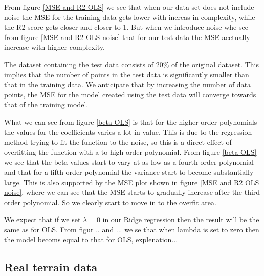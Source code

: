 \noindent From figure \eqref{MSE and R2 OLS} we see that when our data set does not include noise
the MSE for the training data gets lower with increas in complexity, while 
the R2 score gets closer and closer to 1. But when we introduce noise whe see from figure \eqref{MSE and R2 OLS noise}
that for our test data the MSE acctually increase with higher complexity. 

The dataset containing the test data consists of $20\%$ of the original
dataset. This implies that the number of points in the test data is 
significantly smaller than that in the training data. We anticipate 
that by increasing the number of data points, the MSE for the model 
created using the test data will converge towards that of the training
model.

What we can see from figure \eqref{beta OLS} is that for the higher order 
polynomials the values for the coefficients varies a lot in value. This is due to 
the regression method trying to fit the function to the noise, so this is a direct 
effect of overfitting the function with a to high order polynomial. From figure \eqref{beta OLS}
we see that the beta values start to vary at as low as a fourth order polynomial and that 
for a fifth order polynomial the variance start to become substantially large. This is 
also supported by the MSE plot shown in figure \eqref{MSE and R2 OLS noise}, where we can
see that the MSE starts to gradually increase after the third order polynomial. So we clearly
start to move in to the overfit area. 

We expect that if we set $\lambda = 0$ in our Ridge regression then the result 
will be the same as for OLS. From figur .. and ... we se that when lambda is 
set to zero then the model becoms equal to that for OLS, explenation...


\subsection*{Real terrain data}